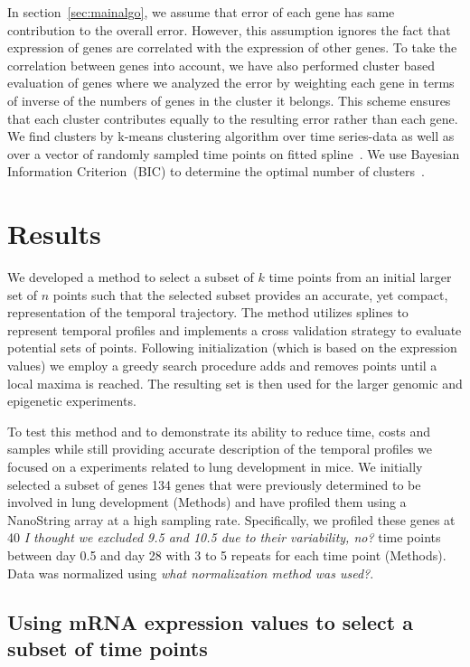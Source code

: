 \documentclass[10pt]{article}
\begin{document}
In section~\ref{sec:mainalgo}, we assume that error of each gene has same contribution to the overall error. However, this assumption ignores the
fact that expression of genes are correlated with the expression of other genes. To take the
correlation between genes into account, we have also performed cluster
based evaluation of genes where we analyzed the error by weighting each gene in terms of inverse of the numbers of
genes in the cluster it belongs. This scheme ensures that each cluster
contributes equally to the resulting error rather than each gene. We find clusters by k-means
clustering algorithm over time series-data as well as over a vector of
randomly sampled time points on fitted spline~\cite{bishop2006}. We use Bayesian Information Criterion~(BIC) to
determine the optimal number of clusters~\cite{bic}.

\section{Results}


We developed a method to select a subset of $k$ time points from an
initial larger set of $n$ points such that the selected subset
provides an accurate, yet compact, representation of the temporal
trajectory.  The method utilizes splines to represent temporal
profiles and implements a cross validation strategy to evaluate
potential sets of points. Following initialization (which is based
on the expression values) we employ a greedy search procedure adds
and removes points until a local maxima is reached. The resulting
set is then used for the larger genomic and epigenetic experiments.

To test this method and to demonstrate its ability to reduce time,
costs and samples while still providing accurate description of the
temporal profiles we focused on a experiments related to lung
development in mice. We initially selected a subset of genes 134
genes that were previously determined to be involved in lung
development (Methods) and have profiled them using a NanoString
array at a high sampling rate.  Specifically, we profiled these
genes at 40 {\em I thought we excluded 9.5 and 10.5 due to their
variability, no?} time points between day 0.5 and day 28 with 3 to 5
repeats for each time point (Methods). Data was normalized using
{\em what normalization method was used?}.

\subsection{Using mRNA expression values to select a subset of time points}\label{sec:findsubset}
\end{document}

